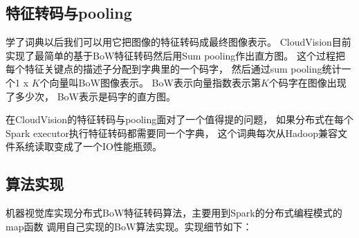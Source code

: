 \subsection{特征转码与pooling}
\label{subsec:feature-encoding}
学了词典以后我们可以用它把图像的特征转码成最终图像表示。
CloudVision目前实现了最简单的基于BoW特征转码然后用Sum pooling作出直方图。
这个过程把每个特征关键点的描述子分配到字典里的一个码字，
然后通过sum pooling统计一个1 x $K$个向量叫BoW图像表示。
BoW表示向量指数表示第$K$个码字在图像出现了多少次，
BoW表示是码字的直方图。

在CloudVision的特征转码与pooling面对了一个值得提的问题，
如果分布式在每个Spark executor执行特征转码都需要同一个字典，
这个词典每次从Hadoop兼容文件系统读取变成了一个IO性能瓶颈。

\subsection*{算法实现}
机器视觉库实现分布式BoW特征转码算法，主要用到Spark的分布式编程模式的map函数
调用自己实现的BoW算法实现。实现细节如下：
